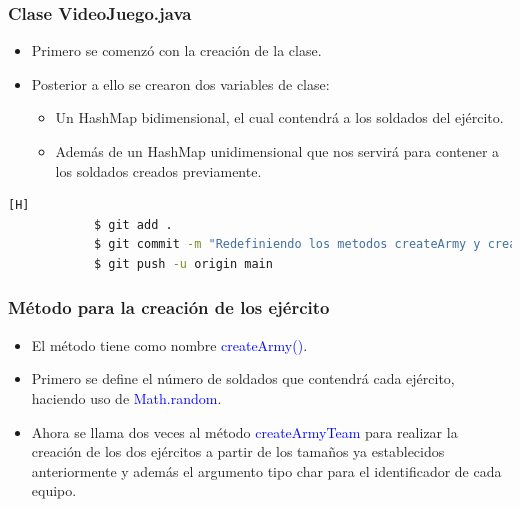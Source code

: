 \documentclass{article}
\begin{document}
        
        \subsubsection{Clase VideoJuego.java}

        \begin{itemize}
            \item Primero se comenzó con la creación de la clase. 
            \item Posterior a ello se crearon dos variables de clase: 
            \begin{itemize}
                \item Un HashMap bidimensional, el cual contendrá a los soldados del ejército.
                \item Además de un HashMap unidimensional que nos servirá para contener a los soldados creados previamente.
            \end{itemize}
        \end{itemize}

        

        \begin{lstlisting}[language=bash,caption={Commit \href{https://github.com/hernanchoquehuanca/fp2-23b/commit/49a014ba00f3309647cc37d3e4b67ab62dcf8642}{49a014b}: En el commit se modificaba las variables de la clase VideoJuego5.java para utilizar HashMap}][H]
    		$ git add .
    		$ git commit -m "Redefiniendo los metodos createArmy y createArmyTeam para ahora trabajar con HashMap, ademas se cambiaron las variables de clase que almacenan el tablero y los ejercitos"			
    		$ git push -u origin main
    	\end{lstlisting}
     
        \subsubsection{Método para la creación de los ejército}

        \begin{itemize}
            \item El método tiene como nombre \textcolor{blue}{createArmy()}.
            \item Primero se define el número de soldados que contendrá cada ejército, haciendo uso de \textcolor{blue}{Math.random}.
            \item Ahora se llama dos veces al método \textcolor{blue}{createArmyTeam} para realizar la creación de los dos ejércitos a partir de los tamaños ya establecidos anteriormente y además el argumento tipo char para el identificador de cada equipo.
        \end{itemize}
\end{document}
